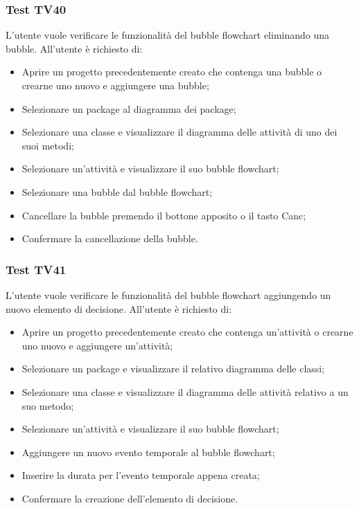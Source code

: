 \documentclass[../PianoDiQualifica.tex]{subfiles}
\begin{document}
	
	\subsubsection{Test TV40} 
	L'utente vuole verificare le funzionalità del bubble flowchart eliminando una bubble. 
	All'utente è richiesto di: 
	\begin{itemize} 
		\item Aprire un progetto precedentemente creato che contenga una bubble o crearne uno nuovo e aggiungere una bubble;
		\item Selezionare un package al diagramma dei package; 
		\item Selezionare una classe e visualizzare il diagramma delle attività di uno dei suoi metodi; 
		\item Selezionare un'attività e visualizzare il suo bubble flowchart; 
		\item Selezionare una bubble dal bubble flowchart; 
		\item Cancellare la bubble premendo il bottone apposito o il tasto Canc; 
		\item Confermare la cancellazione della bubble. 
	\end{itemize} 
	
	
	\subsubsection{Test TV41} 
	L'utente vuole verificare le funzionalità del bubble flowchart aggiungendo un nuovo elemento di decisione. 
	All'utente è richiesto di: 
	\begin{itemize} 
		\item Aprire un progetto precedentemente creato che contenga un'attività o crearne uno nuovo e aggiungere un'attività;
		\item Selezionare un package e visualizzare il relativo diagramma delle classi; 
		\item Selezionare una classe e visualizzare il diagramma delle attività relativo a un suo metodo; %
		\item Selezionare un'attività e visualizzare il suo bubble flowchart; 
		\item Aggiungere un nuovo evento temporale al bubble flowchart; 
		\item Inserire la durata per l'evento temporale appena creata; %
		\item Confermare la creazione dell'elemento di decisione. 
	\end{itemize} 
	
\end{document}
